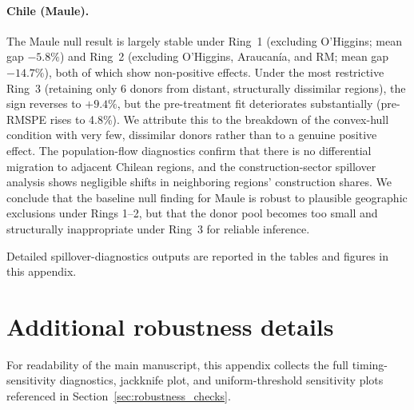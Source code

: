 \documentclass[12pt]{article}
\begin{document}
\paragraph{Chile (Maule).}
The Maule null result is largely stable under Ring~1 (excluding O'Higgins; mean gap $-5.8\%$) and Ring~2 (excluding O'Higgins, Araucanía, and RM; mean gap $-14.7\%$), both of which show non-positive effects. Under the most restrictive Ring~3 (retaining only 6 donors from distant, structurally dissimilar regions), the sign reverses to $+9.4\%$, but the pre-treatment fit deteriorates substantially (pre-RMSPE rises to 4.8\%). We attribute this to the breakdown of the convex-hull condition with very few, dissimilar donors rather than to a genuine positive effect. The population-flow diagnostics confirm that there is no differential migration to adjacent Chilean regions, and the construction-sector spillover analysis shows negligible shifts in neighboring regions' construction shares. We conclude that the baseline null finding for Maule is robust to plausible geographic exclusions under Rings 1--2, but that the donor pool becomes too small and structurally inappropriate under Ring~3 for reliable inference.

Detailed spillover-diagnostics outputs are reported in the tables and figures in this appendix.

\newpage

\section{Additional robustness details}
\label{sec:additional_robustness_appendix}

For readability of the main manuscript, this appendix collects the full timing-sensitivity diagnostics, jackknife plot, and uniform-threshold sensitivity plots referenced in Section~\ref{sec:robustness_checks}.
\end{document}
